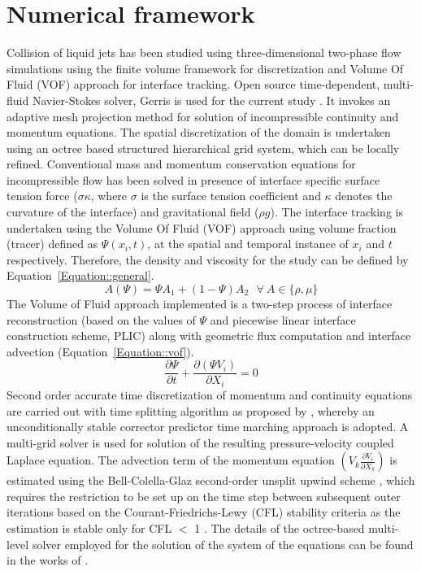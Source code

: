 \documentclass{jfm}
\begin{document}
\section{Numerical framework}
Collision of liquid jets has been studied using three-dimensional two-phase flow simulations using the finite volume framework for discretization and Volume Of Fluid (VOF) approach for interface tracking. Open source time-dependent, multi-fluid Navier-Stokes solver, Gerris is used for the current study \citep{Popinet2003}. It invokes an adaptive mesh projection method for solution of incompressible continuity and momentum equations. The spatial discretization of the domain is undertaken using an octree based structured hierarchical grid system, which can be locally refined. Conventional mass and momentum conservation equations for incompressible flow has been solved in presence of interface specific surface tension force ($\sigma \kappa$, where $\sigma$ is the surface tension coefficient and $\kappa$ denotes the curvature of the interface) and gravitational field ($\rho g$).  The interface tracking is undertaken using the Volume Of Fluid (VOF) approach using volume fraction (tracer) defined as $\Psi(x_i,t)$, at the spatial and temporal instance of $x_i$ and $t$ respectively. Therefore, the density and viscosity for the study can be defined by Equation~\ref{Equation::general}.
\begin{equation} \label{Equation::general}
A (\Psi) = \Psi A_1 + (1-\Psi)A_2 \: \: \:  \forall  \: A \in \{\rho, \mu\}
\end{equation}
The Volume of Fluid approach implemented is a two-step process of interface reconstruction (based on the values of $\Psi$ and piecewise linear interface construction scheme, PLIC) along with geometric flux computation and interface advection (Equation~\ref{Equation::vof}).
\begin{equation} \label{Equation::vof}
\frac{\partial \Psi}{\partial t} + \frac{\partial(\Psi V_i)}{\partial X_i} = 0
\end{equation}
Second order accurate time discretization of momentum and continuity equations are carried out with time splitting algorithm as proposed by \cite{Chorin1968}, whereby an unconditionally stable corrector predictor time marching approach is adopted. A multi-grid solver is used for solution of the resulting pressure-velocity coupled Laplace equation. The advection term of the momentum equation $\left(V_k\frac{\partial V_i}{\partial X_k}\right)$ is estimated using the Bell-Colella-Glaz second-order unsplit upwind scheme \citep{bell1989second}, which requires the restriction to be set up on the time step between subsequent outer iterations based on the Courant-Friedrichs-Lewy (CFL) stability criteria as the estimation is stable only for CFL $<$ 1 \cite{popinet2009}. The details of the octree-based multi-level solver employed for the solution of the system of the equations can be found in the works of \cite{Popinet2003,popinet2009}. \\ 
\end{document}
